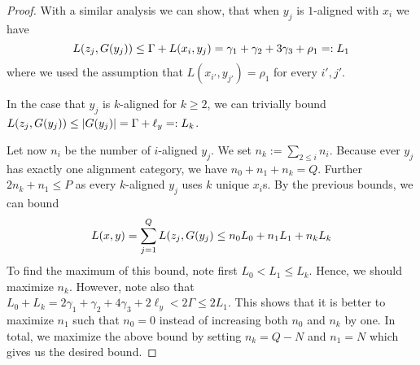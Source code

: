 \begin{proof}
With a similar analysis we can show, that when $y_j$ is $1$-aligned with $x_i$ we have
\[
	L(z_j, G(y_j)) \leq \Gamma + L(x_i, y_j) = \gamma_1 + \gamma_2 + 3\gamma_3 + \rho_1 =: L_1
\]
where we used the assumption that $L(x_{i'}, y_{j'}) = \rho_1$ for every $i', j'$.

In the case that $y_j$ is $k$-aligned for $k \geq 2$, we can trivially bound $L(z_j, G(y_j)) \leq |G(y_j)| = \Gamma + \ell_y =: L_k$.

Let now $n_i$ be the number of $i$-aligned $y_j$.
We set $n_k := \sum_{2\leq i} n_i$.
Because ever $y_j$ has exactly one alignment category, we have $n_0 + n_1 + n_k = Q$.
Further $2n_k + n_1 \leq P$ as every $k$-aligned $y_j$ uses $k$ unique $x_i$s.
By the previous bounds, we can bound
\[
	L(x,y) = \sum_{j=1}^Q L(z_j, G(y_j) \leq n_0 L_0 + n_1 L_1 + n_k L_k
\]
To find the maximum of this bound, note first $L_0 < L_1 \leq L_k$.
Hence, we should maximize $n_k$.
However, note also that $L_0 + L_k = 2\gamma_1 + \gamma_2 + 4\gamma_3 + 2\ell_y < 2\Gamma \leq 2L_1$.
This shows that it is better to maximize $n_1$ such that $n_0 = 0$ instead of increasing both $n_0$ and $n_k$ by one.
In total, we maximize the above bound by setting $n_k = Q-N$ and $n_1 = N$ which gives us the desired bound. 



\end{proof}
